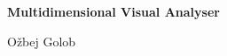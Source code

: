 %
%
% 
% 
% 




\vspace*{2cm}


\begin{center}
\begin{spacing}{1.1}
\Huge\sffamily\bfseries
Multidimensional Visual Analyser
\end{spacing}

\vspace{3cm}


\vspace{3cm}

{\LARGE\sffamily
Ožbej Golob
}
\end{center}








\cleardoublepage


\vspace*{-3cm}

